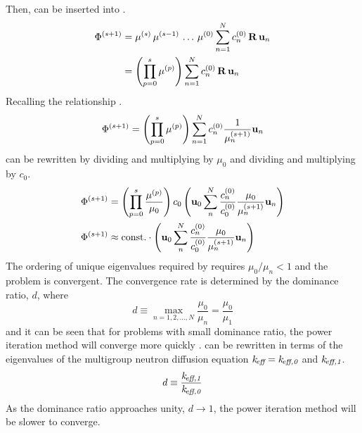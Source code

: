     Then,  can be inserted into
    .
    \begin{align}
      \Phi^{(s+1)} &= \mu^{(s)} \, \mu^{(s-1)} \, \ldots \, 
        \mu^{(0)} \sum_{n=1}^N c_n^{(0)} \, \mathbf{R} \, \mathbf{u}_n \\
      &= \left( \prod_{p=0}^{s} \mu^{(p)} \right) \sum_{n=1}^N c_n^{(0)} \, 
        \mathbf{R} \, \mathbf{u}_n
    \end{align}
    Recalling the relationship .
    \begin{equation}
      \label{eq:phi_expand_above}
      \Phi^{(s+1)} = \left( \prod_{p=0}^s \mu^{(p)} \right) 
        \sum_{n=1}^N c_n^{(0)} \frac{1}{\mu_n^{(s+1)}} \mathbf{u}_n
    \end{equation}
     can be rewritten by dividing and multiplying by
    $\mu_0$ and dividing and multiplying by $c_0$.
    \begin{align}
      \Phi^{(s+1)} &= \left( \prod_{p=0}^s \frac{\mu^{(p)}}{\mu_0} 
        \right) c_0 \left( \mathbf{u}_0 \sum_n^N \frac{c_n^{(0)}}{c_0^{(0)}}
        \frac{\mu_0}{\mu_n^{(s+1)}} \mathbf{u}_n \right) \\
      \label{eq:eigen_phi_converge}
      \Phi^{(s+1)} &\approx \text{const.} \cdot \left( 
        \mathbf{u}_0 \sum_n^N \frac{c_n^{(0)}}{c_0^{(0)}}
        \frac{\mu_0}{\mu_n^{(s+1)}} \mathbf{u}_n \right)
    \end{align}
    The ordering of unique eigenvalues required by  
    requires $\mu_0 / \mu_n < 1$ and the problem is convergent. The 
    convergence rate is determined by the dominance ratio, $d$, where
    \begin{equation}
      \label{eq:old_dominance_ratio}
      d \equiv \max_{n=1,2,\ldots,N} \frac{\mu_0}{\mu_n} =
        \frac{\mu_0}{\mu_1}
    \end{equation}
    and it can be seen that for problems with small dominance ratio, the power
    iteration method will converge more quickly \cite{nakamura}.
     can be rewritten in terms of the eigenvalues
    of the multigroup neutron diffusion equation $k_{\!\mbox{\scriptsize \em eff}}=k_{\!\mbox{\scriptsize \em eff,{0}}}$ and
    $k_{\!\mbox{\scriptsize \em eff,{1}}}$.
    \begin{equation}
      \label{eq:dominance_ratio}
      d \equiv \frac{k_{\!\mbox{\scriptsize \em eff,{1}}}}{k_{\!\mbox{\scriptsize \em eff,{0}}}}
    \end{equation}
    As the 
    dominance ratio approaches unity, $d \rightarrow 1$, the power iteration
    method will be slower to converge. 
    
